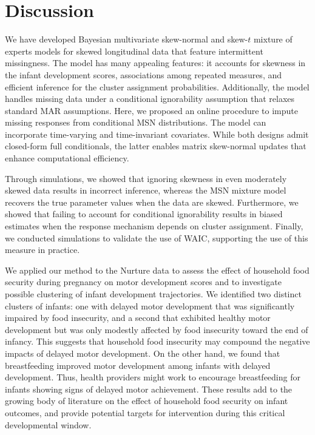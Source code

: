 \documentclass[useAMS,usenatbib,referee]{biom}
\begin{document}
\section{Discussion}
\label{s:discuss}
We have developed Bayesian multivariate skew-normal and skew-$t$ mixture of experts models for skewed longitudinal data that feature intermittent missingness. The model has many appealing features: it accounts for skewness in the infant development scores, associations among repeated measures, and efficient inference for the cluster assignment probabilities. Additionally, the model handles missing data under a conditional ignorability assumption that relaxes standard MAR assumptions. Here, we proposed an online procedure to impute missing responses from conditional MSN distributions. The model can incorporate time-varying and time-invariant covariates. While both designs admit closed-form full conditionals, the latter enables matrix skew-normal updates that enhance computational efficiency.

Through simulations, we showed that ignoring skewness in even moderately skewed data results in incorrect inference, whereas the MSN mixture model recovers the true parameter values when the data are skewed. Furthermore, we showed that failing to account for conditional ignorability results in biased estimates when the response mechanism depends on cluster assignment. Finally, we conducted simulations to validate the use of WAIC, supporting the use of this measure in practice.

We applied our method to the Nurture data to assess the effect of household food security during pregnancy on motor development scores and to investigate possible clustering of infant development trajectories. We identified two distinct clusters of infants: one with delayed motor development that was significantly impaired by food insecurity, and a second that exhibited healthy motor development but was only modestly affected by food insecurity toward the end of infancy. This suggests that household food insecurity may compound the negative impacts of delayed motor development. On the other hand, we found that breastfeeding improved motor development among infants with delayed development. Thus, health providers might work to encourage breastfeeding for infants showing signs of delayed motor achievement. These results add to the growing body of literature on the effect of household food security on infant outcomes, and provide potential targets for intervention during this critical developmental window.
\end{document}
